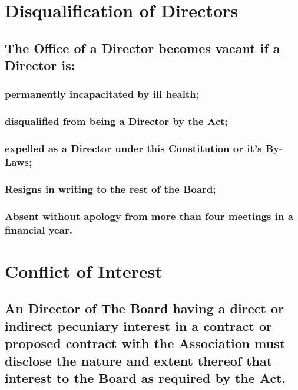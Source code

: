 \documentclass{article}
\newenvironment{subs}
  {\adjustwidth{2em}{0pt}}
  {\endadjustwidth}
\begin{document}
\section{Disqualification of Directors}
\begin{subs}
\subsection{The Office of a Director becomes vacant if a Director is:}
\begin{subs}
\subsubsection{permanently incapacitated by ill health;}
\subsubsection{disqualified from being a Director by the Act;}
\subsubsection{expelled as a Director under this Constitution or it's By-Laws;}
\subsubsection{Resigns in writing to the rest of the Board;}
\subsubsection{Absent without apology from more than four meetings in a financial year.}
\end{subs}
\end{subs}

\section{Conflict of Interest}
\begin{subs}
\subsection{An Director of The Board having a direct or indirect pecuniary interest in a contract or proposed contract with the Association must disclose the nature and extent thereof that interest to the Board as required by the Act.}
\end{subs}
\end{document}
